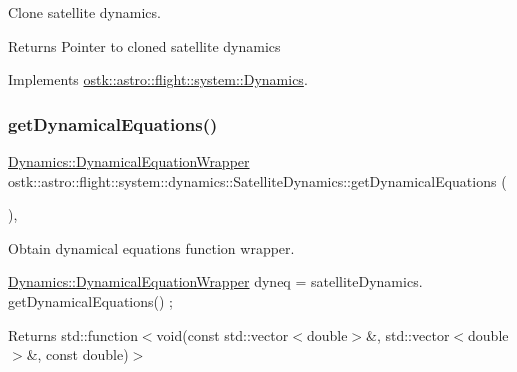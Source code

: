 Clone satellite dynamics. 

\begin{DoxyReturn}{Returns}
Pointer to cloned satellite dynamics 
\end{DoxyReturn}


Implements \hyperlink{classostk_1_1astro_1_1flight_1_1system_1_1_dynamics_a7de1a8ce101f3cee59fd624b487de5be}{ostk\+::astro\+::flight\+::system\+::\+Dynamics}.

\mbox{\label{classostk_1_1astro_1_1flight_1_1system_1_1dynamics_1_1_satellite_dynamics_aed9ddda1a1d1c4636e2c0d6ccc9d5a16}} 
\subsubsection{\texorpdfstring{get\+Dynamical\+Equations()}{getDynamicalEquations()}}
{\footnotesize\ttfamily \hyperlink{classostk_1_1astro_1_1flight_1_1system_1_1_dynamics_a9b14f4fbea6fe1e96af9e71545d4c77e}{Dynamics\+::\+Dynamical\+Equation\+Wrapper} ostk\+::astro\+::flight\+::system\+::dynamics\+::\+Satellite\+Dynamics\+::get\+Dynamical\+Equations (\begin{DoxyParamCaption}{ }\end{DoxyParamCaption})\hspace{0.3cm}{\ttfamily [override]}, {\ttfamily [virtual]}}



Obtain dynamical equations function wrapper. 


\begin{DoxyCode}
\hyperlink{classostk_1_1astro_1_1flight_1_1system_1_1_dynamics_a9b14f4fbea6fe1e96af9e71545d4c77e}{Dynamics::DynamicalEquationWrapper} dyneq = satelliteDynamics.
      getDynamicalEquations() ;
\end{DoxyCode}
 \begin{DoxyReturn}{Returns}
std\+::function$<$void(const std\+::vector$<$double$>$\&, std\+::vector$<$double$>$\&, const double)$>$ 
\end{DoxyReturn}


